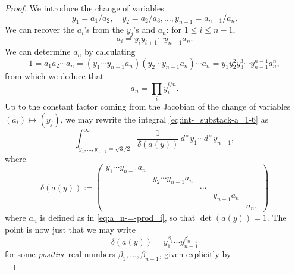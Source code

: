 \documentclass[reqno]{amsart} 
\begin{document}
\begin{proof}
  We introduce the change of variables
  \begin{equation*}
    y_1 = a_1/a_2, \quad y_2 = a_2/a_3, \dotsc, y_{n-1} = a_{n-1}/a_n.
  \end{equation*}
  We can recover the $a_i$'s from the $y_j$'s and $a_n$: for $1 \leq i \leq n-1$,
  \begin{equation*}
    a_i = y_i y_{i+1} \dotsb y_{n-1} a_n.
  \end{equation*}
  We can determine $a_n$ by calculating
  \begin{equation*}
    1 = a_1 a_2 \dotsb a_n = (y_1 \dotsb y_{n-1} a_n) (y_2 \dotsb y_{n-1} a_n) \dotsb a_n = y_1 y_2^2 y_3^3 \dotsb y_{n-1}^{n-1} a_n^n,
  \end{equation*}
  from which we deduce that
  \begin{equation}\label{eq:a_n-=-prod_i}
    a_n =
    \prod_i y_i^{i/n}.
  \end{equation}
  Up to the constant factor coming from the Jacobian of the change of variables $(a_i) \mapsto (y_j)$, we may rewrite the integral \eqref{eq:int-_substack-a_1-6} as
  \begin{equation}\label{eq:int-_y_1-dotsc-2}
    \int _{y_1, \dotsc, y_{n-1} = \sqrt{3}/2}^{\infty}
    \frac{1}{\delta(a(y))}
    \, d^\times y_1 \dotsb d^\times y_{n-1},
  \end{equation}
  where
  \begin{equation*}
    \delta (a (y) ) :=
    \begin{pmatrix}
      y _1 \dotsb y _{n - 1} a _n  &  &  &  &  \\
                                   & y _2 \dotsb y _{n - 1} a _n &  &  &  \\
                                   &  & \dotsb &  &  \\
                                   &  &  & y _{n - 1 } a _n  &  \\
                                   & & & & a _n,
    \end{pmatrix}
  \end{equation*}
  where $a_n$ is defined as in \eqref{eq:a_n-=-prod_i}, so that $\det (a(y)) = 1$.  The point is now just that we may write
  \begin{equation*}
    \delta(a(y)) = y _1 ^{\beta _1 } \dotsb y _{n - 1 } ^{\beta _{n - 1 }}
  \end{equation*}
  for some \emph{positive} real numbers $\beta _1, \dotsc, \beta _{n - 1}$, given explicitly by
  \begin{equation}\label{eq:beta_j-=-j}

\end{equation}
\end{proof}
\end{document}

